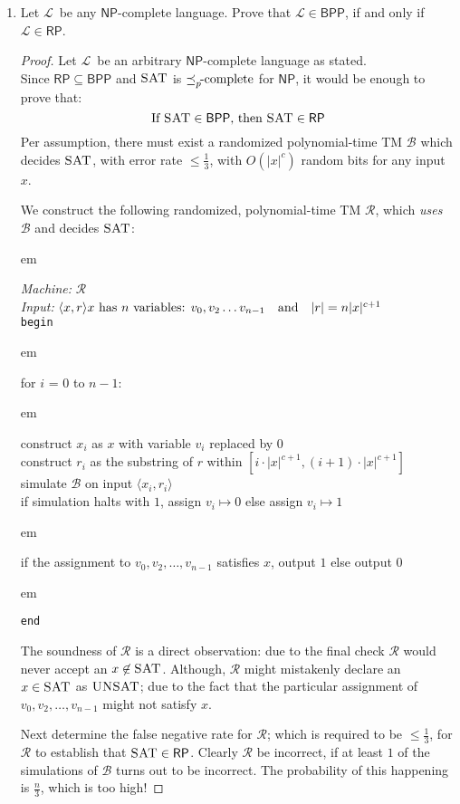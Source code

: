 \documentclass[usletter]{article}
\newcommand {\langset}[1]      {\ensuremath{\mathcal{#1}}}
\newcommand {\machine}[1]      {\ensuremath{\mathscr{#1}}}
\newcommand {\namedlangset}[1] {\ensuremath{\textnormal{\textsc{#1}}}}
\newcommand {\family}[1]       {\ensuremath{\mathsf{#1}}}
\newcommand {\reduce}[2]    {\ensuremath{\preceq_{#1}^{#2}}}
\newcommand {\complete}[2]  {\ensuremath{\reduce{#1}{#2}     %
                                         \hspace*{-4pt}\textnormal{-complete}}}
\newcommand {\indpar}[1]   {
  \par\leftskip=#1em
  \noindent\ignorespaces
}
\newenvironment{turing}[2] {
  \smallskip
  \indpar{2}
  \textit{Machine:} #1\\
  \textit{Input:} $#2$\\[5pt]
  \texttt{begin}
  \parskip=0pt
  \indpar{3}
}{
  \indpar{2}
  \texttt{end}
  \par\medskip
}
\newcommand {\langL}          {\langset{L}}
\newcommand {\NP}     {\family{NP}}
\newcommand {\RP}     {\family{RP}}
\newcommand {\BPP}    {\family{BPP}}
\begin{document}
\begin{enumerate}[labelsep=2.5em, label=\textbf{\arabic{enumi}}]
  \item Let \langL\ be any \NP-complete language. Prove that $\langL \in \BPP$,
        if and only if $\langL \in \RP$.
  \begin{proof}
    Let \langL\ be an arbitrary \NP-complete language as stated. \\
    Since $\RP \subseteq \BPP$ and \namedlangset{SAT} is \complete{p}{} for \NP,
    it would be enough to prove that:
    $$
    \text{If } \namedlangset{SAT} \in \BPP
    \text{, then } \namedlangset{SAT} \in \RP
    $$
    Per assumption, there must exist a randomized polynomial-time TM \machine{B}
    which decides \namedlangset{SAT}, with error rate $\leq \frac{1}{3}$, with
    $O(|x|^c)$ random bits for any input $x$.

    We construct the following randomized, polynomial-time TM \machine{R}, which
    \textit{uses} \machine{B} and decides \namedlangset{SAT}:
    \begin{turing}
          {\machine{R}}
          {\langle x, r \rangle
            \hfill x \text{ has } n \text{ variables: } v_0, v_2 \ldots v_{n-1}
            \quad \text{and} \quad |r| = n|x|^{c+1}}
      for $i$ = $0$ to $n-1$:
        \indpar{4}
        construct $x_i$ as $x$ with variable $v_i$ replaced by $0$ \\
        construct $r_i$ as the substring of $r$ within
          $[i \cdot |x|^{c+1}, (i+1) \cdot |x|^{c+1}]$ \\
        simulate \machine{B} on input $\langle x_i, r_i \rangle$ \\
        if simulation halts with $1$, assign $v_i \mapsto 0$ else
          assign $v_i \mapsto 1$
      \indpar{3}
      if the assignment to $v_0, v_2, \ldots , v_{n-1}$ satisfies $x$,
        output $1$ else output $0$
    \end{turing}

    The soundness of \machine{R} is a direct observation: due to the final check
    \machine{R} would never accept an $x \not\in \namedlangset{SAT}$. Although,
    \machine{R} might mistakenly declare an $x \in \namedlangset{SAT}$ as
    \namedlangset{UNSAT}; due to the fact that the particular assignment of
    $v_0, v_2, \ldots , v_{n-1}$ might not satisfy $x$.

    Next determine the false negative rate for \machine{R}; which is required to
    be $\leq \frac{1}{3}$, for \machine{R} to establish that
    $\namedlangset{SAT} \in \RP$. Clearly \machine{R} be incorrect, if at least
    $1$ of the simulations of \machine{B} turns out to be incorrect. The
    probability of this happening is $\frac{n}{3}$, which is too high!


\end{proof}
\end{enumerate}
\end{document}
